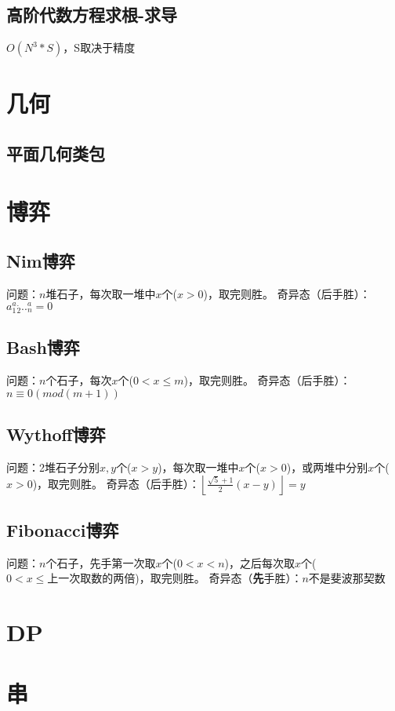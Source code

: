 \documentclass[10pt]{article}
\begin{document}
\subsection{高阶代数方程求根-求导}
$O(N^3*S)$，S取决于精度

\section{几何}
\subsection{平面几何类包}

\section{博弈}
\subsection{Nim博弈}
问题：$n$堆石子，每次取一堆中$x$个($x>0$)，取完则胜。
奇异态（后手胜）：$a_1^a_2^...^a_n=0$

\subsection{Bash博弈}
问题：$n$个石子，每次$x$个($0<x\leq m$)，取完则胜。
奇异态（后手胜）：$n\equiv 0(mod(m+1))$

\subsection{Wythoff博弈}
问题：2堆石子分别$x, y$个($x>y$)，每次取一堆中$x$个($x>0$)，或两堆中分别$x$个($x>0$)，取完则胜。
奇异态（后手胜）：$\left \lfloor \frac{\sqrt{5}+1}{2} (x-y) \right \rfloor =y$

\subsection{Fibonacci博弈}
问题：$n$个石子，先手第一次取$x$个($0<x<n$)，之后每次取$x$个($0<x\leq 上一次取数的两倍$)，取完则胜。
奇异态（\textbf{先}手胜）：$n$不是斐波那契数
\section{DP}
\section{串}
\end{document}
